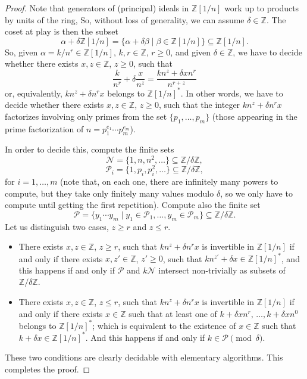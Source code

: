 \documentclass[english]{amsart}
\theoremstyle{definition}
\newcommand\ZZ{\mathbb{Z}}
\begin{document}
\begin{proof}
Note that generators of (principal) ideals in $\ZZ[1/n]$ work up to products by units of the ring, So, without loss of generality, we can assume $\delta\in \ZZ$. The coset at play is then the subset 
 $$
\alpha +\delta\ZZ[1/n] =\{ \alpha +\delta\beta \mid \beta\in \ZZ[1/n]\}\subseteq \ZZ[1/n].
 $$
So, given $\alpha=k/n^r\in \ZZ[1/n]$, $k,r\in \ZZ$, $r\geq 0$, and given $\delta\in \ZZ$,  we have to decide whether there exists $x,z\in \ZZ$, $z\geq 0$, such that 
 $$
\frac{k}{n^r}+\delta \frac{x}{n^z} =\frac{kn^z+\delta x n^r}{n^{r+z}}
 $$
or, equivalently, $kn^z+\delta n^r x$ belongs to $\ZZ[1/n]^*$. In other words, we have to decide whether there exists $x,z\in \ZZ$, $z\geq 0$, such that the integer $kn^z+\delta n^r x$ factorizes involving only primes from the set $\{p_1, \ldots ,p_m\}$ (those appearing in the prime factorization of $n=p_1^{e_1}\cdots p_m^{e_m}$).  

In order to decide this, compute the finite sets
 $$
\mathcal{N}=\{1, n, n^2, \ldots\}\subseteq \ZZ/\delta \ZZ,
 $$
 $$
\mathcal{P}_i=\{1, p_i, p_i^2, \ldots \}\subseteq \ZZ/\delta \ZZ,
 $$
for $i=1,\ldots ,m$ (note that, on each  one, there are infinitely many powers to compute, but they take only finitely many values modulo $\delta$, so we only have to compute until getting the first repetition). Compute also the finite set 
 $$
\mathcal{P}=\{y_1\cdots y_m \mid y_1\in \mathcal{P}_1, \ldots , y_m\in \mathcal{P}_m \}\subseteq \ZZ/\delta \ZZ.
 $$
Let us distinguish two cases, $z\geq r$ and $z\leq r$. 
\begin{itemize}
\item There exists $x,z\in \ZZ$, $z\geq r$, such that $kn^z+\delta n^r x$ is invertible in $\ZZ[1/n]$ if and only if there exists $x,z'\in \ZZ$, $z'\geq 0$, such that $kn^{z'}+\delta x\in \ZZ[1/n]^*$, and this happens if and only if $\mathcal{P}$ and $k\mathcal{N}$ intersect non-trivially as subsets of $\ZZ/\delta \ZZ$. 
%
\item There exists $x,z\in \ZZ$, $z\leq r$, such that $kn^z+\delta n^r x$ is invertible in $\ZZ[1/n]$ if and only if there exists $x\in \ZZ$ such that at least one of $k+\delta xn^r,\, \ldots ,k+\delta xn^0$ belongs to $\ZZ[1/n]^*$; which is equivalent to the existence of $x\in \ZZ$ such that $k+\delta x\in \ZZ[1/n]^*$. And this happens if and only if $k\in \mathcal{P} \pmod{\delta}$. 
\end{itemize} 
These two conditions are clearly decidable with elementary algorithms. This completes the proof. 
\end{proof}
\end{document}
